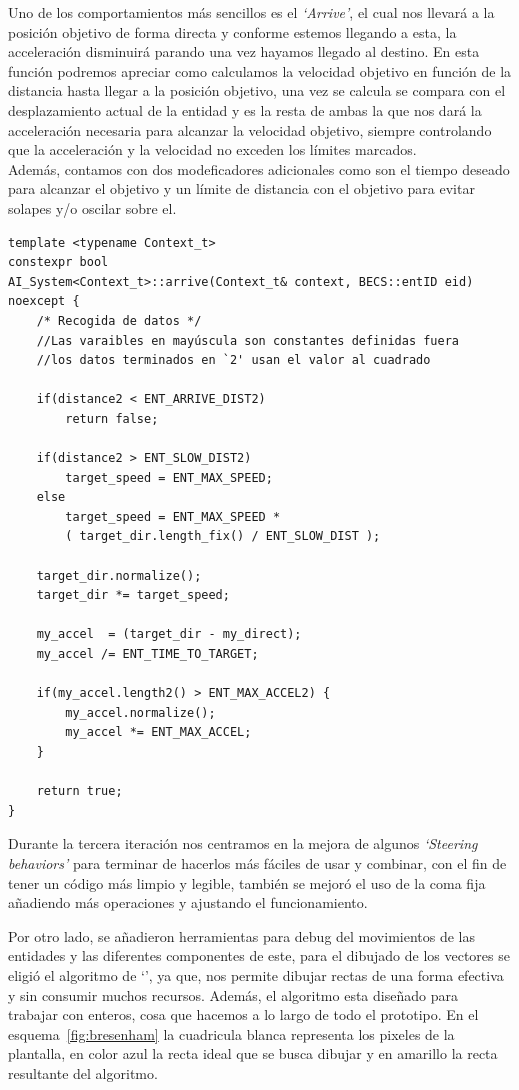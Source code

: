 Uno de los comportamientos más sencillos es el \textit{`Arrive'}, el cual nos
llevará a la posición objetivo de forma directa y conforme estemos llegando a esta, la 
acceleración disminuirá parando una vez hayamos llegado al destino. En esta función podremos
apreciar como calculamos la velocidad objetivo en función de la distancia hasta llegar a
la posición objetivo, una vez se calcula se compara con el desplazamiento actual de la entidad
y es la resta de ambas la que nos dará la acceleración necesaria para alcanzar la velocidad
objetivo, siempre controlando que la acceleración y la velocidad no exceden los límites 
marcados.\\
Además, contamos con dos modeficadores adicionales como son el tiempo deseado para alcanzar el
objetivo y un límite de distancia con el objetivo para evitar solapes y/o oscilar sobre el.

\begin{lstlisting}[style=CodigoC++, caption={Arrive behavior}, label=ia_arrive] 
template <typename Context_t>
constexpr bool
AI_System<Context_t>::arrive(Context_t& context, BECS::entID eid) noexcept {
	/* Recogida de datos */
	//Las varaibles en mayúscula son constantes definidas fuera
	//los datos terminados en `2' usan el valor al cuadrado

	if(distance2 < ENT_ARRIVE_DIST2)
		return false;

	if(distance2 > ENT_SLOW_DIST2)
		target_speed = ENT_MAX_SPEED;
	else
		target_speed = ENT_MAX_SPEED * 
		( target_dir.length_fix() / ENT_SLOW_DIST );
	
	target_dir.normalize();
	target_dir *= target_speed;

	my_accel  = (target_dir - my_direct);
	my_accel /= ENT_TIME_TO_TARGET;

	if(my_accel.length2() > ENT_MAX_ACCEL2) {
		my_accel.normalize();
		my_accel *= ENT_MAX_ACCEL;
	}

	return true;
}
\end{lstlisting}

Durante la tercera iteración nos centramos en la mejora de algunos \textit{`Steering behaviors'}
para terminar de hacerlos más fáciles de usar y combinar, con el fin de tener un código más 
limpio y legible, también se mejoró el uso de la coma fija añadiendo más operaciones y ajustando
el funcionamiento.

Por otro lado, se añadieron herramientas para debug del movimientos de las entidades y las
diferentes componentes de este, para el dibujado de los vectores se eligió el algoritmo de
`\citeauthor*{Bresenham1962}', ya que, nos permite dibujar rectas de una forma efectiva
y sin consumir muchos recursos. Además, el algoritmo esta diseñado para trabajar con enteros,
cosa que hacemos a lo largo de todo el prototipo. En el esquema~\ref{fig:bresenham} la 
cuadricula blanca representa los pixeles de la plantalla, en color azul la recta ideal que
se busca dibujar y en amarillo la recta resultante del algoritmo.

